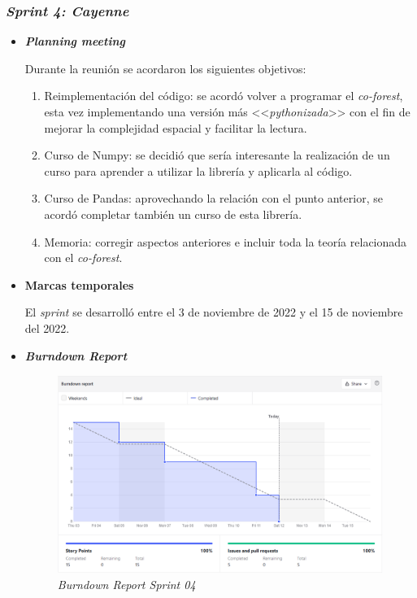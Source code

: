 \subsubsection{\textit{Sprint 4: Cayenne}}
\begin{itemize}
	\item \textbf{\textit{Planning meeting}}
	
	Durante la reunión se acordaron los siguientes objetivos:
	
	\begin{enumerate}
		\item Reimplementación del código: se acordó volver a programar el \textit{co-forest}, esta vez implementando una versión más <<\textit{pythonizada}>> con el fin de mejorar la complejidad espacial y facilitar la lectura.
		\item Curso de Numpy: se decidió que sería interesante la realización de un curso para aprender a utilizar la librería y aplicarla al código.
		\item Curso de Pandas: aprovechando la relación con el punto anterior, se acordó completar también un curso de esta librería.
		\item Memoria: corregir aspectos anteriores e incluir toda la teoría relacionada con el \textit{co-forest}.
	\end{enumerate}
	
	\item \textbf{Marcas temporales}
	
	El \textit{sprint} se desarrolló entre el 3 de noviembre de 2022 y el 15 de noviembre del 2022.
			
	\item \textbf{\textit{Burndown Report}}
	\begin{figure}[h]
		\caption[\textit{Sprint} 04: \textit{burndown report}]{\textit{Burndown Report Sprint 04}}
		\centering
		\includegraphics[width=\textwidth]{../img/anexos/bdr/s04_bdr}
	\end{figure}
	

\end{itemize}
